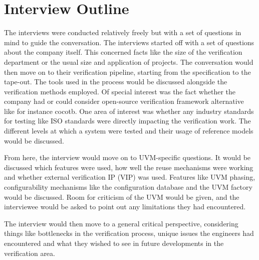 
\section{Interview Outline} %

The interviews were conducted relatively freely but with a set of questions in mind to guide the conversation. The
interviews started off with a set of questions about the company itself. This concerned facts like the size of the
verification department or the usual size and application of projects. The conversation would then move on to their
verification pipeline, starting from the specification to the tape-out. The tools used in the process would be
discussed alongside the verification methods employed. Of special interest was the fact whether the company had or
could consider open-source verification framework alternative like for instance cocotb. One area of interest was
whether any industry standards for testing like ISO standards were directly impacting the verification work. The
different levels at which a system were tested and their usage of reference models would be discussed.

From here, the interview would move on to UVM-specific questions. It would be discussed which features were used, how
well the reuse mechanisms were working and whether external verification IP (VIP) was used. Features like UVM
phasing, configurability mechanisms like the configuration database and the UVM factory would be discussed. Room for
criticism of the UVM would be given, and the interviewee would be asked to point out any limitations they had encountered.

The interview would then move to a general critical perspective, considering things like bottlenecks in the
verification process, unique issues the engineers had encountered and what they wished to see in future developments
in the verification area.

